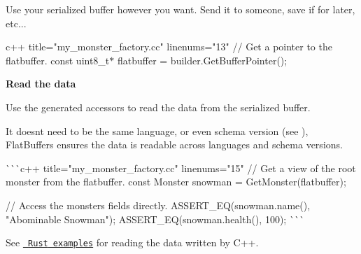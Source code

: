\begin{DoxyEnumerate}
Use your serialized buffer however you want. Send it to someone, save if for later, etc...

{\ttfamily c++ title="{}my\+\_\+monster\+\_\+factory.\+cc"{} linenums="{}13"{} // Get a pointer to the flatbuffer. const uint8\+\_\+t\texorpdfstring{$\ast$}{*} flatbuffer = builder.\+Get\+Buffer\+Pointer(); }
\item {\bfseries{Read the data}}

Use the generated accessors to read the data from the serialized buffer.

It doesn\textquotesingle{}t need to be the same language, or even schema version (see ), Flat\+Buffers ensures the data is readable across languages and schema versions.

\`{}\`{}\`{}c++ title="{}my\+\_\+monster\+\_\+factory.\+cc"{} linenums="{}15"{} // Get a view of the root monster from the flatbuffer. const Monster snowman = Get\+Monster(flatbuffer);

// Access the monster\textquotesingle{}s fields directly. ASSERT\+\_\+\+EQ(snowman.\+name(), "{}\+Abominable Snowman"{}); ASSERT\+\_\+\+EQ(snowman.\+health(), 100); \`{}\`{}\`{} ~\newline


See \href{https://github.com/google/flatbuffers/blob/master/samples/sample_binary.rs\#L92-L106}{\texttt{ {\ttfamily Rust} examples}} for reading the data written by {\ttfamily C++}. 
\end{DoxyEnumerate}